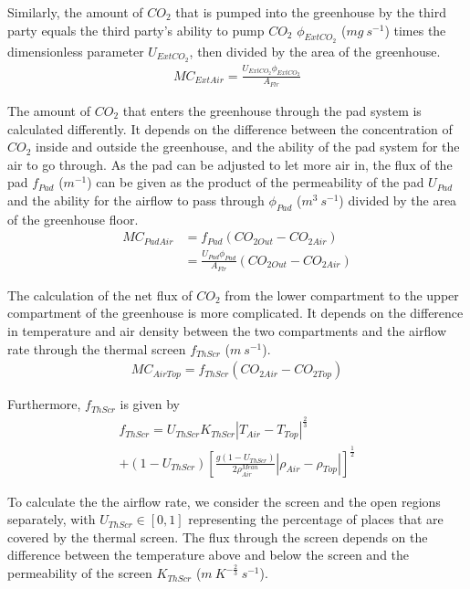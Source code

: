 \documentclass[a4paper]{article}
\numberwithin{equation}{section}
\begin{document}
Similarly, the amount of \( CO_2 \) that is pumped into the greenhouse by the third party equals the third party's ability to pump \( CO_2 \) \( \phi_{ExtCO_2} \) (\( mg\ s^{-1} \)) times the dimensionless parameter \( U_{ExtCO_2} \), then divided by the area of the greenhouse.
\begin{align}
  MC_{ExtAir} = \frac{U_{ExtCO_2}\phi_{ExtCO_2}}{A_{Flr}}
\end{align}

The amount of \( CO_2 \) that enters the greenhouse through the pad system is calculated differently.
It depends on the difference between the concentration of \( CO_2 \) inside and outside the greenhouse, and the ability of the pad system for the air to go through.
As the pad can be adjusted to let more air in, the flux of the pad \( f_{Pad} \) (\( m^{-1} \)) can be given as the product of the permeability of the pad \( U_{Pad} \) and the ability for the airflow to pass through \( \phi_{Pad} \) (\( m^3\ s^{-1} \)) divided by the area of the greenhouse floor.
\begin{equation}
  \begin{split}
    MC_{PadAir} & = f_{Pad} (CO_{2 Out} - CO_{2 Air}) \\
    & = \frac{U_{Pad} \phi_{Pad}}{A_{Flr}} (CO_{2 Out} - CO_{2 Air})
  \end{split}
\end{equation}

The calculation of the net flux of \( CO_2 \) from the lower compartment to the upper compartment of the greenhouse is more complicated.
It depends on the difference in temperature and air density between the two compartments and the airflow rate through the thermal screen \( f_{ThScr} \) (\( m\ s^{-1} \)).
\begin{align}
  MC_{AirTop} = f_{ThScr} (CO_{2 Air} - CO_{2 Top})
\end{align}

Furthermore, \( f_{ThScr} \) is given by
\begin{multline}
  f_{ThScr} = U_{ThScr} K_{ThScr} |T_{Air} - T_{Top}|^{\frac{2}{3}} \\
  + (1 - U_{ThScr}) {\left[\frac{g(1 - U_{ThScr})}{2\rho^{Mean}_{Air}} |\rho_{Air} - \rho_{Top}|\right]}^{\frac{1}{2}}
\end{multline}

To calculate the the airflow rate, we consider the screen and the open regions separately, with \( U_{ThScr} \in [0,1] \) representing the percentage of places that are covered by the thermal screen. The flux through the screen depends on the difference between the temperature above and below the screen and the permeability of the screen \( K_{ThScr} \) (\( m\ K^{-\frac{2}{3}}\ s^{-1} \)).
\end{document}
